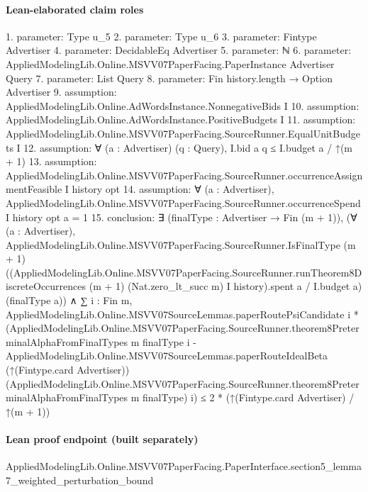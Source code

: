 \documentclass[10pt]{article}
\begin{document}
\paragraph{Lean-elaborated claim roles}\begin{ReviewVerbatim}
1. parameter: Type u_5
2. parameter: Type u_6
3. parameter: Fintype Advertiser
4. parameter: DecidableEq Advertiser
5. parameter: ℕ
6. parameter: AppliedModelingLib.Online.MSVV07PaperFacing.PaperInstance Advertiser Query
7. parameter: List Query
8. parameter: Fin history.length → Option Advertiser
9. assumption: AppliedModelingLib.Online.AdWordsInstance.NonnegativeBids I
10. assumption: AppliedModelingLib.Online.AdWordsInstance.PositiveBudgets I
11. assumption: AppliedModelingLib.Online.MSVV07PaperFacing.SourceRunner.EqualUnitBudgets I
12. assumption: ∀ (a : Advertiser) (q : Query), I.bid a q ≤ I.budget a / ↑(m + 1)
13. assumption: AppliedModelingLib.Online.MSVV07PaperFacing.SourceRunner.occurrenceAssignmentFeasible I history opt
14. assumption: ∀ (a : Advertiser), AppliedModelingLib.Online.MSVV07PaperFacing.SourceRunner.occurrenceSpend I history opt a = 1
15. conclusion: ∃ (finalType : Advertiser → Fin (m + 1)),
  (∀ (a : Advertiser),
      AppliedModelingLib.Online.MSVV07PaperFacing.SourceRunner.IsFinalType (m + 1)
        ((AppliedModelingLib.Online.MSVV07PaperFacing.SourceRunner.runTheorem8DiscreteOccurrences (m + 1)
                (Nat.zero_lt_succ m) I history).spent
            a /
          I.budget a)
        (finalType a)) ∧
    ∑ i : Fin m,
        AppliedModelingLib.Online.MSVV07SourceLemmas.paperRoutePsiCandidate i *
          (AppliedModelingLib.Online.MSVV07PaperFacing.SourceRunner.theorem8PreterminalAlphaFromFinalTypes m finalType
              i -
            AppliedModelingLib.Online.MSVV07SourceLemmas.paperRouteIdealBeta (↑(Fintype.card Advertiser))
              (AppliedModelingLib.Online.MSVV07PaperFacing.SourceRunner.theorem8PreterminalAlphaFromFinalTypes m
                finalType)
              i) ≤
      2 * (↑(Fintype.card Advertiser) / ↑(m + 1))
\end{ReviewVerbatim}

\paragraph{Lean proof endpoint (built separately)}\begin{ReviewVerbatim}
AppliedModelingLib.Online.MSVV07PaperFacing.PaperInterface.section5_lemma7_weighted_perturbation_bound
\end{ReviewVerbatim}
\end{document}
